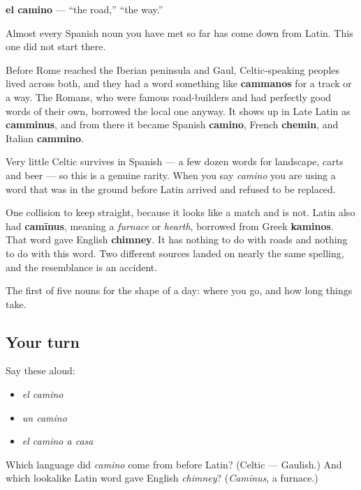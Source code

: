 \begin{cousinweb}
\textbf{el camino} — \textquotedblleft{}the road,\textquotedblright{} \textquotedblleft{}the way.\textquotedblright{}

Almost every Spanish noun you have met so far has come down from Latin. This one did not start there.

Before Rome reached the Iberian peninsula and Gaul, Celtic-speaking peoples lived across both, and they had a word something like \textbf{cammanos} for a track or a way. The Romans, who were famous road-builders and had perfectly good words of their own, borrowed the local one anyway. It shows up in Late Latin as \textbf{camminus}, and from there it became Spanish \textbf{camino}, French \textbf{chemin}, and Italian \textbf{cammino}.

Very little Celtic survives in Spanish — a few dozen words for landscape, carts and beer — so this is a genuine rarity. When you say \emph{camino} you are using a word that was in the ground before Latin arrived and refused to be replaced.

One collision to keep straight, because it looks like a match and is not. Latin also had \textbf{camīnus}, meaning a \emph{furnace} or \emph{hearth}, borrowed from Greek \textbf{kaminos}. That word gave English \textbf{chimney}. It has nothing to do with roads and nothing to do with this word. Two different sources landed on nearly the same spelling, and the resemblance is an accident.
\end{cousinweb}

\begin{grammarlens}[title={What you've built}]
The first of five nouns for the shape of a day: where you go, and how long things take.
\end{grammarlens}

\subsection*{Your turn}
Say these aloud:

\begin{itemize}
\raggedright
  \item \emph{el camino}
  \item \emph{un camino}
  \item \emph{el camino a casa}
\end{itemize}

\begin{tcolorbox}[breakable,colback=teal!4,colframe=teal!35!black,title={Before you move on}]
Which language did \emph{camino} come from before Latin? (Celtic — Gaulish.) And which lookalike Latin word gave English \emph{chimney}? (\emph{Camīnus}, a furnace.)
\end{tcolorbox}

